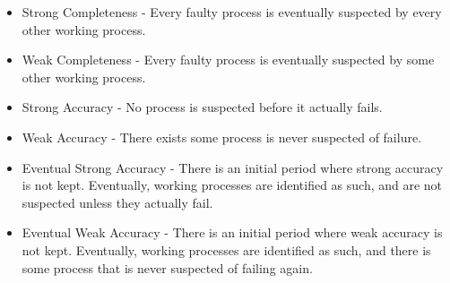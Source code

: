 \begin{itemize}
    \item Strong Completeness - Every faulty process is eventually suspected by
        every other working process.
    \item Weak Completeness - Every faulty process is eventually suspected by 
        some other working process.
    \item Strong Accuracy - No process is suspected before it actually fails.
    \item Weak Accuracy - There exists some process is never suspected of failure.
    \item Eventual Strong Accuracy - There is an initial period where strong
        accuracy is not kept. Eventually, working processes are identified
        as such, and are not suspected unless they actually fail.
    \item Eventual Weak Accuracy - There is an initial period where weak
        accuracy is not kept. Eventually, working processes are identified
        as such, and there is some process that is never suspected of failing
        again.
\end{itemize}


